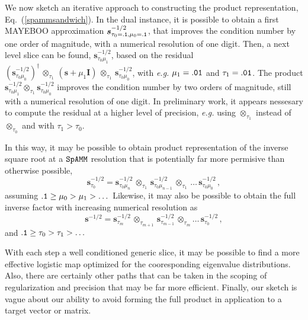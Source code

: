 \documentclass[letterpaper,twocolumn,amsmath,amsfont,amssymb,english,aps,jcp,preprintnumbers,groupaddress,nofootinbib,tightenlines,floatfix]{revtex4}
\newcommand{\mat}[1]{\boldsymbol{#1}}
\newcommand{\oto}{ {\scriptstyle \otimes}_{ \! \tau_0 } }
\newcommand{\otone}{ {\scriptstyle \otimes}_{ \! \tau_1 } }
\newcommand{\otm}{ {\scriptstyle \otimes}_{ \! \tau_m } }
\newcommand{\otpm}{ {\scriptstyle \otimes}_{ \! \tau_{m+1}}}
\theoremstyle{plain}
\theoremstyle{remark}
\theoremstyle{plain}
\begin{document}
We now sketch an iterative approach to constructing the product representation, Eq.~(\ref{spammsandwich}).
In the dual instance, it is possible to obtain a first MAYEBOO approximation $\mat{s}^{-1/2}_{\tau_0={\tt .1}, \mu_0={\tt .1}}$,
that improves the condition number by one order of magnitude, with a numerical resolution of one digit.
Then, a next level slice can be found, $\mat{s}^{-1/2}_{\tau_0 \mu_1}$, based on the residual 
$\left(\mat{s}^{-1/2}_{\tau_0\mu_0} \right)^\dagger \, \otone \, \left(\mat{s}+\mu_1 \mat{I} \right)  
\, \otone \,\mat{s}^{-1/2}_{\tau_0 \mu_0} $, with {\em e.g.} 
$\mu_1= \tt .01$ and $\tau_1={\tt .01}$.   The product $\mat{s}^{-1/2}_{\tau_0 \mu_1}  \otone \mat{s}^{-1/2}_{\tau_0 \mu_0}$
improves the condition number by two orders of magnitude, still with a numerical resolution of one digit.
In preliminary work, it appears nessesary to compute the residual at a higher level of precision, 
{\em e.g.} using $\otone$ instead of $\oto$ and with $\tau_1 > \tau_0$.

In this way,  it may be possible to obtain product representation of the inverse square root at a $\tt SpAMM$ resolution that is
potentially far more permisive than otherwise possible,
\begin{equation} \label{product_rep}
\mat{s}^{-1/2}_{\tau_0} = \mat{s}^{-1/2}_{\tau_0 \mu_n} \, \otone \, \mat{s}^{-1/2}_{\tau_0 \mu_{n-1}} \, \otone \, \dots  \,  \mat{s}^{-1/2}_{\tau_0 \mu_0} \, ,
\end{equation}
assuming ${\tt .1} \ge \mu_0 > \mu_1 > \dots$  Likewise, it may also  be possible to obtain the full inverse factor with 
increasing numerical resolution as 
\begin{equation} \label{product_rep_tau}
\mat{s}^{-1/2} = \mat{s}^{-1/2}_{\tau_m} \, \otpm \,  \mat{s}^{-1/2}_{\tau_{m-1}} \, \otm \dots \, \mat{s}^{-1/2}_{\tau_0} \, ,
\end{equation}
and ${\tt .1} \ge  \tau_0 > \tau_1 > \dots $   

With each step a well conditioned generic slice, it may be possible to find a more effective logistic map optimized 
for the cooresponding eigenvalue distributions. 
Also, there are certainly other paths that can be taken in the scoping of regularization and precision that
may be far more efficient. Finally, our sketch is vague about our ability to avoid forming the 
full product in application to a target vector or matrix.  
\end{document}
